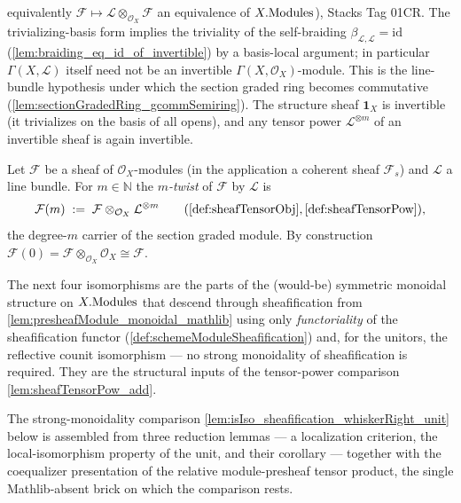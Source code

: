 \begin{definition}
  equivalently \(\mathcal{F} \mapsto \mathcal{L} \otimes_{\mathcal{O}_X}
  \mathcal{F}\) an equivalence of \(X.\mathrm{Modules}\)), Stacks Tag 01CR. The
  trivializing-basis form implies the triviality of the self-braiding
  \(\beta_{\mathcal{L},\mathcal{L}} = \mathrm{id}\)
  (\cref{lem:braiding_eq_id_of_invertible}) by a basis-local argument; in
  particular \(\Gamma(X,\mathcal{L})\) itself need not be an invertible
  \(\Gamma(X,\mathcal{O}_X)\)-module. This is the line-bundle hypothesis under which
  the section graded ring becomes commutative
  (\cref{lem:sectionGradedRing_gcommSemiring}). The structure sheaf \(\mathbf{1}_X\)
  is invertible (it trivializes on the basis of all opens), and any tensor power
  \(\mathcal{L}^{\otimes m}\) of an invertible sheaf is again invertible.
\end{definition}


\begin{definition}\leanok
  \label{def:sheafModuleTwist}
  Let \(\mathcal{F}\) be a sheaf of \(\mathcal{O}_X\)-modules (in the application
  a coherent sheaf \(\mathcal{F}_s\)) and \(\mathcal{L}\) a line bundle. For
  \(m \in \mathbb{N}\) the \emph{\(m\)-twist} of \(\mathcal{F}\) by
  \(\mathcal{L}\) is
  \[
    \mathcal{F}(m) \;:=\;
      \mathcal{F} \otimes_{\mathcal{O}_X} \mathcal{L}^{\otimes m}
      \qquad(\cref{def:sheafTensorObj}, \cref{def:sheafTensorPow}),
  \]
  the degree-\(m\) carrier of the section graded module. By construction
  \(\mathcal{F}(0) = \mathcal{F} \otimes_{\mathcal{O}_X} \mathcal{O}_X \cong
  \mathcal{F}\).
\end{definition}


The next four isomorphisms are the parts of the (would-be) symmetric monoidal
structure on \(X.\mathrm{Modules}\) that descend through sheafification from
\cref{lem:presheafModule_monoidal_mathlib} using only \emph{functoriality} of the
sheafification functor (\cref{def:schemeModuleSheafification}) and, for the
unitors, the reflective counit isomorphism --- no strong monoidality of
sheafification is required. They are the structural inputs of the tensor-power
comparison \cref{lem:sheafTensorPow_add}.


The strong-monoidality comparison \cref{lem:isIso_sheafification_whiskerRight_unit}
below is assembled from three reduction lemmas --- a localization criterion, the
local-isomorphism property of the unit, and their corollary --- together with the
coequalizer presentation of the relative module-presheaf tensor product, the single
Mathlib-absent brick on which the comparison rests.


